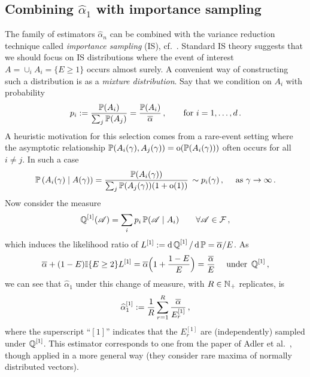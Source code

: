 \subsection{Combining $\hat{\alpha}_1$ with importance sampling} \label{scn:IS}

The family of estimators $\hat{\alpha}_n$ can be combined with the
variance reduction technique called \emph{importance sampling} (IS), cf.\ \cite{asmussen2007stochastic,glasserman2003monte}. Standard IS theory suggests that we should focus on IS distributions where the event of interest $A = \cup_i A_i = \{E \ge 1\}$ occurs almost surely.
A convenient way of constructing such a distribution is as a \emph{mixture distribution}. Say that we condition on $A_i$ with probability
\[ p_i := \frac{\operatorname{{\mathbb P}}(A_i)}{ \sum_j \operatorname{{\mathbb P}}(A_j) } = \frac{\operatorname{{\mathbb P}}(A_i)}{ \overline{\alpha}} \,,\qquad \text{for } i=1,\dots,d\,. \]
A heuristic motivation for this selection comes from a rare-event setting where the asymptotic relationship
$\operatorname{{\mathbb P}}(A_i(\gamma), A_j(\gamma))={\mathrm{o}}(\operatorname{{\mathbb P}}(A_i(\gamma)))$ often occurs for all $i\neq j$.
In such a case
\[
 \operatorname{{\mathbb P}}\left(A_i(\gamma) \mid A(\gamma) \right)
   = \dfrac{\operatorname{{\mathbb P}}(A_i(\gamma))}{\sum_j \operatorname{{\mathbb P}}(A_j(\gamma))(1 + {\mathrm{o}}(1))} \,   \sim p_i(\gamma) \,, \quad \text{ as } \gamma \to \infty\,. \]
Now consider the measure
\[ \operatorname{\mathbb Q}^{[1]}( \mathscr{A} ) = \sum_i p_i \operatorname{{\mathbb P}}( \mathscr{A} \mid A_i ) \qquad \forall \mathscr{A} \in \mathcal{F} \,,  \]
which induces the likelihood ratio of $L^{[1]} := \mathop{}\!\mathrm{d} \operatorname{\mathbb Q}^{[1]} / \mathop{}\!\mathrm{d} \operatorname{{\mathbb P}} = \overline{\alpha}/E$.
As
\[
  \overline{\alpha} + (1-E)\mathbb{I}\{ E \ge 2 \} L^{[1]}
  = \overline{\alpha} \Bigl( 1 + \frac{1-E}{E} \Bigr) \\
  = \frac{\overline{\alpha}}{E} \quad \text{ under } \operatorname{\mathbb Q}^{[1]}\, ,
\]
we can see that $\hat{\alpha}_1$ under this change of measure, with $R \in \mathbb{N}_+$ replicates, is
\begin{equation} \label{alpha_1_IS1}
  \hat{\alpha}_{1}^{[1]} \defeq \frac1R \sum_{r=1}^R \frac{\alphaMax}{E_r^{[1]}} \,, %
\end{equation}
where the superscript ``$[1]$'' indicates that the $E_r^{[1]}$ are (independently) sampled under $\operatorname{\mathbb Q}^{[1]}$. This estimator corresponds to one from the paper of Adler et al.\ \cite{adler1990introduction}, though applied in a  more general way (they consider rare maxima of normally distributed vectors).

